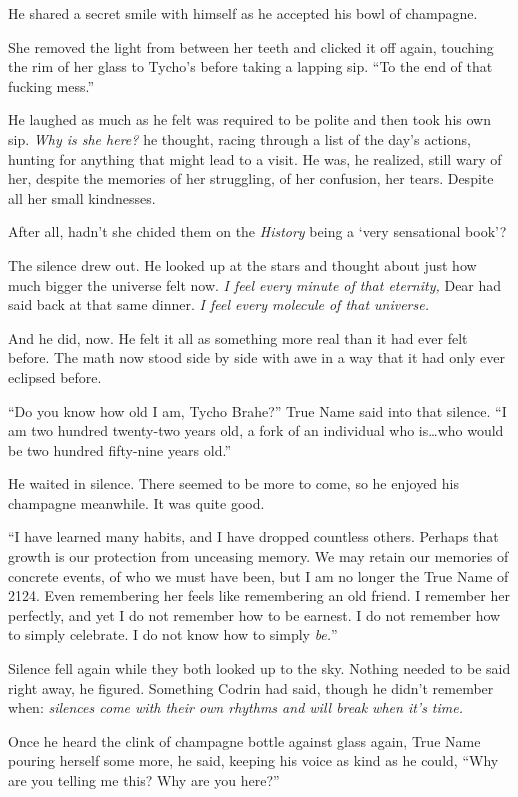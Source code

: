 He shared a secret smile with himself as he accepted his bowl of champagne.

She removed the light from between her teeth and clicked it off again, touching the rim of her glass to Tycho's before taking a lapping sip. ``To the end of that fucking mess.''

He laughed as much as he felt was required to be polite and then took his own sip. \emph{Why is she here?} he thought, racing through a list of the day's actions, hunting for anything that might lead to a visit. He was, he realized, still wary of her, despite the memories of her struggling, of her confusion, her tears. Despite all her small kindnesses.

After all, hadn't she chided them on the \emph{History} being a `very sensational book'?

The silence drew out. He looked up at the stars and thought about just how much bigger the universe felt now. \emph{I feel every minute of that eternity,} Dear had said back at that same dinner. \emph{I feel every molecule of that universe.}

And he did, now. He felt it all as something more real than it had ever felt before. The math now stood side by side with awe in a way that it had only ever eclipsed before.

``Do you know how old I am, Tycho Brahe?'' True Name said into that silence. ``I am two hundred twenty-two years old, a fork of an individual who is\ldots who would be two hundred fifty-nine years old.''

He waited in silence. There seemed to be more to come, so he enjoyed his champagne meanwhile. It was quite good.

``I have learned many habits, and I have dropped countless others. Perhaps that growth is our protection from unceasing memory. We may retain our memories of concrete events, of who we must have been, but I am no longer the True Name of 2124. Even remembering her feels like remembering an old friend. I remember her perfectly, and yet I do not remember how to be earnest. I do not remember how to simply celebrate. I do not know how to simply \emph{be.}''

Silence fell again while they both looked up to the sky. Nothing needed to be said right away, he figured. Something Codrin had said, though he didn't remember when: \emph{silences come with their own rhythms and will break when it's time.}

Once he heard the clink of champagne bottle against glass again, True Name pouring herself some more, he said, keeping his voice as kind as he could, ``Why are you telling me this? Why are you here?''

